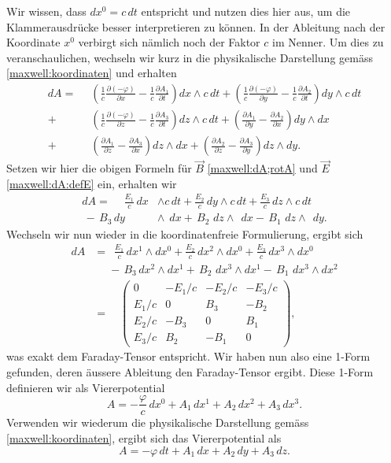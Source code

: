 Wir wissen, dass $dx^0 = c\,dt$ entspricht und nutzen dies hier aus, um die Klammerausdrücke besser interpretieren zu können.
In der Ableitung nach der Koordinate $x^0$ verbirgt sich nämlich noch der Faktor $c$ im Nenner.
Um dies zu veranschaulichen, wechseln wir kurz in die physikalische Darstellung gemäss \eqref{maxwell:koordinaten} und erhalten
\begin{align*}
	dA = \phantom{\frac{1}{c}}
	& \left(\frac{1}{c}\frac{\partial (-\varphi)}{\partial x}-\frac{1}{c}\frac{\partial A_1}{\partial t}\right) dx \wedge c\,dt 
	+ \left(\frac{1}{c}\frac{\partial (-\varphi)}{\partial y}-\frac{1}{c}\frac{\partial A_2}{\partial t}\right) dy \wedge c\,dt 
	\\
	+ &\left(\frac{1}{c}\frac{\partial (-\varphi)}{\partial z}-\frac{1}{c}\frac{\partial A_3}{\partial t}\right) dz \wedge c\,dt
	+ \left(\frac{\partial A_1}{\partial y}-\frac{\partial A_2}{\partial x}\right) dy \wedge dx 
	\\
	+ &\left(\frac{\partial A_1}{\partial z}-\frac{\partial A_3}{\partial x}\right) dz \wedge dx 
	+ \left(\frac{\partial A_2}{\partial z}-\frac{\partial A_3}{\partial y}\right) dz \wedge dy.
\end{align*}
Setzen wir hier die obigen Formeln für $\vec{B}$ \eqref{maxwell:dA;rotA} und $\vec{E}$ \eqref{maxwell:dA:defE} ein, erhalten wir
\begin{align*}
	dA = \phantom{+}
	\frac{E_1}{c} \,dx &\wedge c\,dt +
	\frac{E_2}{c} \,dy \wedge c\,dt +
	\frac{E_3}{c} \,dz \wedge c\,dt
	\\
	\, - \, B_3 \, dy &\wedge \phantom{c}dx +
	\, B_2 \,  \, dz \wedge \phantom{c} dx -
	\, B_1 \, \, dz \wedge \phantom{c} dy.
\end{align*}
Wechseln wir nun wieder in die koordinatenfreie Formulierung, ergibt sich
\begin{align*}
	dA &= \,\,\,
	 \frac{E_1}{c} \,dx^1 \wedge dx^0 +
	\frac{E_2}{c} \,dx^2 \wedge dx^0 +
	\frac{E_3}{c} \,dx^3 \wedge dx^0
	\\
	& \phantom{=}- \, B_3 \, dx^2 \wedge dx^1 +
	\, B_2 \, \, dx^3 \wedge dx^1 -
	\, B_1 \, \, dx^3 \wedge dx^2
	\\[2ex] 
	&= \quad 
	\begin{pmatrix}
		0 & -E_1/c & -E_2/c & -E_3/c \\ E_1/c & 0 & B_3 & -B_2 \\ E_2/c & -B_3 & 0 & B_1 \\ E_3/c & B_2 & -B_1 & 0 
	\end{pmatrix},
\end{align*}
was exakt dem Faraday-Tensor entspricht.
Wir haben nun also eine 1-Form gefunden, deren äussere Ableitung den Faraday-Tensor ergibt.
Diese 1-Form definieren wir als Viererpotential
\begin{equation}
	A = -\frac{\varphi}{c}\,dx^0 + A_1 \,dx^1 + A_2 \,dx^2 + A_3 \,dx^3.
\end{equation}
Verwenden wir wiederum die physikalische Darstellung gemäss \eqref{maxwell:koordinaten},
ergibt sich das Viererpotential als
\begin{equation}
	A = -\varphi\,dt + A_1 \,dx + A_2 \,dy + A_3 \,dz.
\end{equation}
